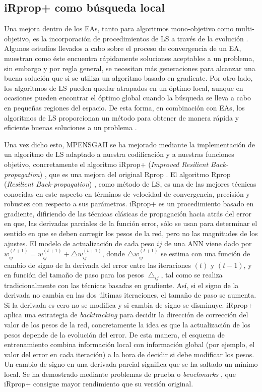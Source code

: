\subsection{iRprop+ como búsqueda local}\label{rprop}
\noindent Una mejora dentro de los EAs, tanto para algoritmos mono-objetivo como
multi-objetivo, es la incorporación de procedimientos de LS a través de la evolución
\cite{Cotta2001,Grosan2007,Goh2009}. Algunos estudios llevados a cabo sobre el proceso de
convergencia de un EA, muestran como éste encuentra rápidamente soluciones aceptables a un
problema, sin embargo y por regla general, se necesitan más generaciones para alcanzar una
buena solución \cite{Houck1997} que si se utiliza un algoritmo basado en gradiente. Por
otro lado, los algoritmos de LS pueden quedar atrapados en un óptimo local, aunque en
ocasiones pueden encontrar el óptimo global cuando la búsqueda se lleva a cabo en pequeñas
regiones del espacio. De esta forma, en combinación con EAs, los algoritmos de LS
proporcionan un método para obtener de manera rápida y eficiente buenas soluciones
a un problema \cite{Smith2007}.

Una vez dicho esto, MPENSGAII se ha mejorado mediante la implementación de un algoritmo de
LS adaptado a nuestra codificación y a nuestras funciones objetivo, concretamente el
algoritmo iRprop+ (\textit{Improved Resilient Back-propagation}) \cite{Igel2003}, que es
una mejora del original Rprop \cite{Riedmiller1993}. El algoritmo Rprop (\textit{Resilient
Back-propagation}) \cite{Riedmiller1993}, como método de LS, es una de las mejores
técnicas conocidas en este aspecto en términos de velocidad de convergencia, precisión y
robustez con respecto a sus parámetros. iRprop+ es un procedimiento basado
en gradiente, difiriendo de las técnicas clásicas de propagación hacia atrás del error en
que, las derivadas parciales de la función error, sólo se usan para determinar el
sentido en que se deben corregir los pesos de la red, pero no las magnitudes de los
ajustes. El modelo de actualización de cada peso $ij$ de una ANN viene dado por
$\displaystyle
w_{ij}^{(t+1)}=w_{ij}^{(t+1)}+\bigtriangleup w_{ij}^{(t+1)}$, donde
$\bigtriangleup w_{ij}^{(t+1)}$ se estima con una función de cambio de signo de la
derivada del error entre las iteraciones $(t)$ y $(t-1)$, y en función del tamaño de paso
para los pesos $\bigtriangleup _{ij}$, tal como se realiza tradicionalmente con las
técnicas basadas en
gradiente. Así, si el signo de la derivada no cambia en las dos últimas iteraciones, el
tamaño de paso se aumenta. Si la derivada es cero no se modifica y si cambia de signo
se disminuye. iRprop+ aplica una estrategia de \textit{backtracking} para decidir la
dirección de corrección del valor de los pesos de la red, concretamente la idea es que la
actualización de los pesos depende de la evolución del error. De esta manera, el esquema
de entrenamiento combina información local con información global (por ejemplo, el valor
del error en cada iteración) a la hora de decidir si debe modificar los pesos. Un cambio
de signo en una derivada parcial significa que se ha saltado un mínimo local. Se ha
demostrado mediante problemas de prueba o \textit{benchmarks} \cite{Igel2003}, que
iRprop+ consigue mayor rendimiento que su versión original.

